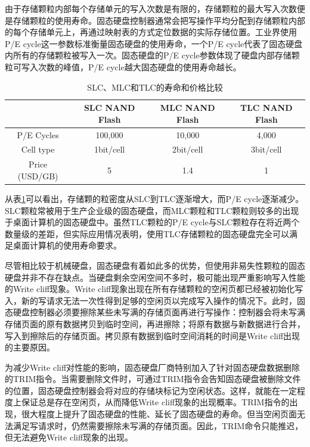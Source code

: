 由于存储颗粒内部每个存储单元的写入次数是有限的，存储颗粒的最大写入次数便是存储颗粒的使用寿命。固态硬盘控制器通常会把写操作平均分配到存储颗粒内部的每个存储单元上，再通过映射表的方式定位数据的实际存储位置。工业界使用P/E cycle这一参数标准衡量固态硬盘的使用寿命，一个P/E cycle代表了固态硬盘内所有的存储颗粒被写入一次。固态硬盘的P/E cycle参数体现了硬盘内部存储颗粒可写入次数的峰值，P/E cycle越大固态硬盘的使用寿命越长。

\begin{table}[htb]
\centering
\caption{SLC、MLC和TLC的寿命和价格比较}
\begin{tabular}{|c|c|c|c|}
\hline  & SLC NAND Flash & MLC NAND Flash & TLC NAND Flash \\
\hline P/E Cycles & 100,000 & 10,000 & 4,000 \\
\hline Cell type & 1bit/cell & 2bit/cell & 3bit/cell \\
\hline Price (USD/GB) & 5 & 1.4 & 1 \\
\hline
\end{tabular}
\label{tab:slc-mlc-tlc-compare}
\end{table}

从表\ref{tab:slc-mlc-tlc-compare}可以看出，存储颗的粒密度从SLC到TLC逐渐增大，而P/E cycle逐渐减少。SLC颗粒常被用于生产企业级的固态硬盘，而MLC颗粒和TLC颗粒则较多的出现于桌面计算机的固态硬盘中。虽然TLC颗粒的P/E cycle与SLC颗粒存在将近两个数量级的差距，但实际应用情况表明，使用TLC存储颗粒的固态硬盘完全可以满足桌面计算机的使用寿命要求。

尽管相比较于机械硬盘，固态硬盘有着如此多的优势，但使用非易失性颗粒的固态硬盘并非不存在缺点。当硬盘剩余空闲空间不多时，极可能出现严重影响写入性能的Write cliff现象。Write cliff现象出现在所有存储颗粒的空闲页都已经被初始化写入，新的写请求无法一次性得到足够的空闲页以完成写入操作的情况下。此时，固态硬盘控制器必须要擦除某些未写满的存储页面再进行写操作：控制器会将未写满存储页面的原有数据拷贝到临时空间，再进擦除；将原有数据与新数据进行合并，写入到擦除后的存储页面。拷贝原有数据到临时空间消耗的时间是Write cliff出现的主要原因。

为减少Write cliff对性能的影响，固态硬盘厂商特别加入了针对固态硬盘数据删除的TRIM指令。当需要删除文件时，可通过TRIM指令会告知固态硬盘被删除文件的位置，固态硬盘控制器会将对应的存储块标记为空闲状态。这样，就能在一定程度上保证总是存在空闲页，从而降低Write cliff现象的出现概率。TRIM指令的出现，很大程度上提升了固态硬盘的性能、延长了固态硬盘的寿命。但当空闲页面无法满足写请求时，仍然需要擦除未写满的存储页面。因此，TRIM命令只能推迟，但无法避免Write cliff现象的出现。

